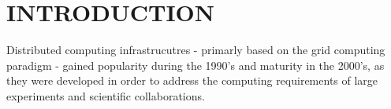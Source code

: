 \section{INTRODUCTION}


Distributed computing infrastrucutres - primarly based on the grid computing paradigm - gained popularity during the 1990's and maturity in the 2000's, as they were developed in order to address the computing requirements of large experiments and scientific collaborations.
